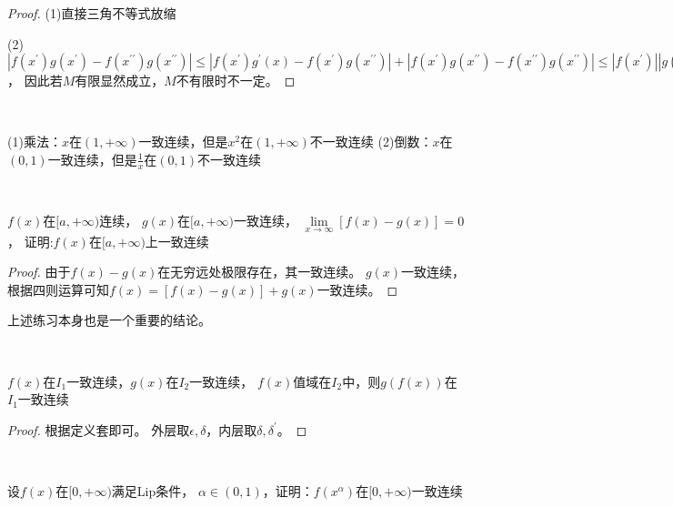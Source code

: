\begin{proof}
  (1)直接三角不等式放缩

  (2)$|f(x^{\prime})g(x^{\prime}) - f(x^{\prime\prime})g(x^{\prime\prime})| \leq |f(x^{\prime})g^{\prime}(x) - f(x^{\prime}) g(x^{\prime\prime})| + |f(x^{\prime})g(x^{\prime\prime}) - f(x^{\prime\prime})g(x^{\prime\prime})| \leq |f(x^{\prime})||g(x^{\prime}) - g(x^{\prime\prime})| + |g(x^{\prime\prime})||f(x^{\prime}) - f(x^{\prime\prime})| < 2M\epsilon$，
  因此若$M$有限显然成立，$M$不有限时不一定。
\end{proof}

~

\begin{example}[四则运算反例]
  (1)乘法：$x$在$(1,+\infty)$一致连续，但是$x^2$在$(1,+\infty)$不一致连续
  (2)倒数：$x$在$(0,1)$一致连续，但是$\frac{1}{x}$在$(0,1)$不一致连续
\end{example}

~

\begin{exercise}[四则运算练习]
  $f(x)$在$[a,+\infty)$连续，
  $g(x)$在$[a,+\infty)$一致连续，
  $\lim \limits _{x \rightarrow \infty}[f(x) - g(x)] = 0$，
  证明:$f(x)$在$[a,+\infty)$上一致连续
\end{exercise}

\begin{proof}
  由于$f(x) - g(x)$在无穷远处极限存在，其一致连续。
  $g(x)$一致连续，
  根据四则运算可知$f(x) = [f(x) - g(x)] + g(x)$一致连续。
\end{proof}

\begin{note}
  上述练习本身也是一个重要的结论。
\end{note}

~

\begin{theorem}[复合的一致连续性]
  $f(x)$在$I_1$一致连续，$g(x)$在$I_2$一致连续，
  $f(x)$值域在$I_2$中，则$g(f(x))$在$I_1$一致连续
\end{theorem}

\begin{proof}
  根据定义套即可。
  外层取$\epsilon, \delta$，内层取$\delta, \delta^{\prime}$。
\end{proof}

~

\begin{exercise}[复合一致连续性]
  设$f(x)$在$[0,+\infty)$满足Lip条件，
  $\alpha \in (0,1)$，证明：$f(x^{\alpha})$在$[0,+\infty)$一致连续
\end{exercise}

